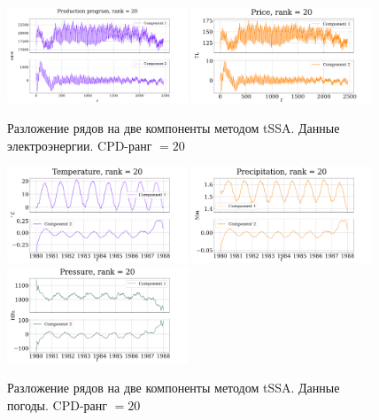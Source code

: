 			\begin{figure}[h!]
				\centering
				\includegraphics[width=0.48\textwidth, keepaspectratio]{../experiments/electricity/tssa/figs/decomposition/cpd_rank_20/Production_program.png}
				\includegraphics[width=0.48\textwidth, keepaspectratio]{../experiments/electricity/tssa/figs/decomposition/cpd_rank_20/Price.png}
				\caption{Разложение рядов на две компоненты методом tSSA. Данные электроэнергии. CPD-ранг $ = 20 $}\label{fig:electr_decomp_tssa}
			\end{figure}
			
			\begin{figure}[h!]
				\centering
				\includegraphics[width=0.48\textwidth, keepaspectratio]{../experiments/weather/tssa/figs/decomposition/cpd_rank_20/Temperature.png}
				\includegraphics[width=0.48\textwidth, keepaspectratio]{../experiments/weather/tssa/figs/decomposition/cpd_rank_20/Precipitation.png}
				\includegraphics[width=0.48\textwidth, keepaspectratio]{../experiments/weather/tssa/figs/decomposition/cpd_rank_20/Pressure.png}
				\caption{Разложение рядов на две компоненты методом tSSA. Данные погоды. CPD-ранг $ = 20 $}\label{fig:weather_decomp_tssa}
			\end{figure}
			
